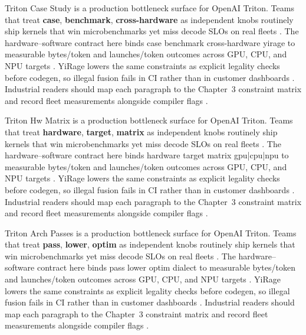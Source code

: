 Triton Case Study is a production bottleneck surface for OpenAI Triton. Teams that treat \textbf{case}, \textbf{benchmark}, \textbf{cross-hardware} as independent knobs routinely ship kernels that win microbenchmarks yet miss decode SLOs on real fleets \citep{taxbreak2026,semianalysis2024tma}. The hardware--software contract here binds case benchmark cross-hardware yirage to measurable bytes/token and launches/token outcomes across GPU, CPU, and NPU targets \citep{memoryfloor2026,amd2024xdna}. YiRage lowers the same constraints as explicit legality checks before codegen, so illegal fusion fails in CI rather than in customer dashboards \citep{nvidia2022hopper,amd2024aie}. Industrial readers should map each paragraph to the Chapter~3 constraint matrix and record fleet measurements alongside compiler flags \citep{semianalysis2024tma,dlbook}.

Triton Hw Matrix is a production bottleneck surface for OpenAI Triton. Teams that treat \textbf{hardware}, \textbf{target}, \textbf{matrix} as independent knobs routinely ship kernels that win microbenchmarks yet miss decode SLOs on real fleets \citep{memoryfloor2026,amd2024xdna}. The hardware--software contract here binds hardware target matrix gpu|cpu|npu to measurable bytes/token and launches/token outcomes across GPU, CPU, and NPU targets \citep{nvidia2022hopper,amd2024aie}. YiRage lowers the same constraints as explicit legality checks before codegen, so illegal fusion fails in CI rather than in customer dashboards \citep{semianalysis2024tma,dlbook}. Industrial readers should map each paragraph to the Chapter~3 constraint matrix and record fleet measurements alongside compiler flags \citep{amd2024xdna,dao2022flashattention}.

Triton Arch Passes is a production bottleneck surface for OpenAI Triton. Teams that treat \textbf{pass}, \textbf{lower}, \textbf{optim} as independent knobs routinely ship kernels that win microbenchmarks yet miss decode SLOs on real fleets \citep{nvidia2022hopper,amd2024aie}. The hardware--software contract here binds pass lower optim dialect to measurable bytes/token and launches/token outcomes across GPU, CPU, and NPU targets \citep{semianalysis2024tma,dlbook}. YiRage lowers the same constraints as explicit legality checks before codegen, so illegal fusion fails in CI rather than in customer dashboards \citep{amd2024xdna,dao2022flashattention}. Industrial readers should map each paragraph to the Chapter~3 constraint matrix and record fleet measurements alongside compiler flags \citep{amd2024aie,kwon2023vllm}.


